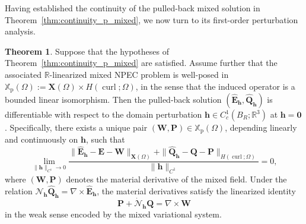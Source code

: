 \documentclass[12pt,reqno]{amsart}
\theoremstyle{definition}
\newtheorem{theo}{Theorem}[section]
\numberwithin{equation}{section}
\begin{document}
Having established the continuity of the pulled-back mixed solution in
Theorem~\ref{thm:continuity_p_mixed}, we now turn to its first-order
perturbation analysis.
\begin{theo}\label{th:p_material_differentiability}
Suppose that the hypotheses of Theorem~\ref{thm:continuity_p_mixed} are satisfied. Assume further that the associated $\mathbb{R}$-linearized mixed NPEC problem is well-posed in $\mathbb{X}_{\mathrm{p}}(\Omega) := \mathbf X(\Omega)\times H(\operatorname{curl};\Omega)$, in the sense that the induced operator is a bounded linear isomorphism. 
Then the pulled-back solution $(\hat{\mathbf{E}}_{\mathbf{h}}, \hat{\mathbf{Q}}_{\mathbf{h}})$ is  differentiable with respect to the domain perturbation $\mathbf{h} \in C_c^1(B_R; \mathbb{R}^3)$ at $\mathbf{h} = \mathbf{0}$. Specifically, there exists a unique pair $(\mathbf{W}, \mathbf{P}) \in \mathbb{X}_{\mathrm{p}}(\Omega)$, depending linearly and continuously on $\mathbf{h}$, such that
\begin{equation*}
\lim_{\|\mathbf{h}\|_{C^1} \to 0} \frac{\|\hat{\mathbf{E}}_{\mathbf{h}} - \mathbf{E} - \mathbf{W}\|_{\mathbf{X}(\Omega)} + \|\hat{\mathbf{Q}}_{\mathbf{h}} - \mathbf{Q} - \mathbf{P}\|_{H(\operatorname{curl};\Omega)}}{\|\mathbf{h}\|_{C^1}} = 0,
\end{equation*}
where $(\mathbf{W}, \mathbf{P})$ denotes the material derivative of the mixed field. Under the relation $\mathcal{N}_{\mathbf{h}} \hat{\mathbf{Q}}_{\mathbf{h}} = \nabla \times \hat{\mathbf{E}}_{\mathbf{h}}$, the material derivatives satisfy the linearized identity
\[
\mathbf{P} + \dot{\mathcal{N}}_{\mathbf{h}} \mathbf{Q} = \nabla \times \mathbf{W}
\]
in the weak sense encoded by the mixed variational system. 


\end{theo}
\end{document}
